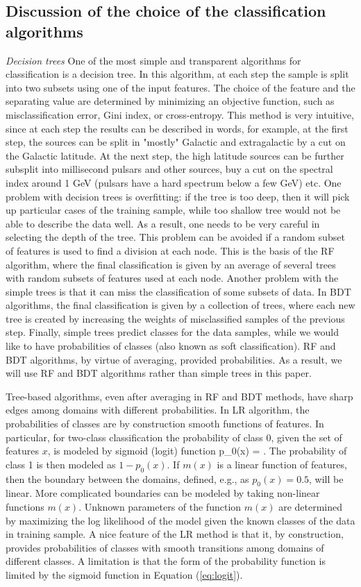 \subsection{Discussion of the choice of the classification algorithms}
{\it Decision trees}
One of the most simple and transparent algorithms for classification is a decision tree.
In this algorithm, at each step the sample is split into two subsets using one of the input features.
The choice of the feature and the separating value are determined by minimizing an objective function, such as misclassification
error, Gini index, or cross-entropy.
This method is very intuitive, since at each step the results can be described in words, 
for example, at the first step, the sources can be split in "mostly" Galactic and extragalactic by a cut on the Galactic latitude.
At the next step, the high latitude sources can be further subsplit into millisecond pulsars and other sources, buy a cut on the spectral index around 1 GeV (pulsars have a hard spectrum below a few GeV) etc.
One problem with decision trees is overfitting: if the tree is too deep, then it will pick up particular cases of the training sample, while too shallow tree would not be able to describe the data well. As a result, one needs to be very careful in selecting the depth of the tree.
This problem can be avoided if a random subset of features is used to find a division at each node. This is the basis of the RF algorithm,
where the final classification is given by an average of several trees with random subsets of features used at each node.
Another problem with the simple trees is that it can miss the classification of some subsets of data. In BDT algorithms, the final classification is given by a collection of trees, where each new tree is created by increasing the weights of misclassified samples of the previous step. 
Finally, simple trees predict classes for the data samples, while we would like to have probabilities of classes (also known as soft classification).
RF and BDT algorithms, by virtue of averaging, provided probabilities. As a result, we will use RF and BDT algorithms rather than simple trees in this paper.

Tree-based algorithms, even after averaging in RF and BDT methods, have sharp edges among domains with different probabilities.
In LR algorithm, the probabilities of classes are by construction smooth functions of features.
In particular, for two-class classification the probability of class 0, given the set of features $x$, is modeled by sigmoid (logit) function
\be
{}
p_0(x) = .
\ee
The probability of class 1 is then modeled as $1 - p_0(x)$.
If $m(x)$ is a linear function of features, then the boundary between the domains, defined, e.g., as $p_0(x) = 0.5$, will be linear.
More complicated boundaries can be modeled by taking non-linear functions $m(x)$.
Unknown parameters of the function $m(x)$ are determined by maximizing the log likelihood of the model given the known classes of the data in training sample.
A nice feature of the LR method is that it, by construction, provides probabilities of classes with smooth transitions among domains of different classes.
A limitation is that the form of the probability function is limited by the sigmoid function in Equation (\ref{eq:logit}).


